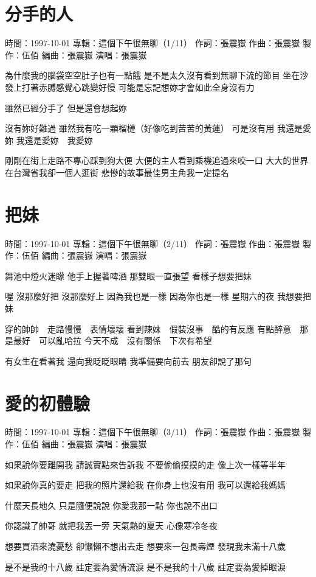 \documentclass[UTF8,a4paper,oneside,twocolumn,12pt]{ctexbook}
\newcommand{\infopair}[2]{\textbullet #1：#2}
\newcommand{\zc}[1][伍佰]{\infopair{作詞}{#1}}
\newcommand{\zq}[1][伍佰]{\infopair{作曲}{#1}}
\newcommand{\bq}[1][伍佰]{\infopair{編曲}{#1}}
\newcommand{\zj}[1]{\infopair{專輯}{#1}}
\newcommand{\zz}[1]{\infopair{製作}{#1}}
\newcommand{\sj}[1]{\infopair{時間}{#1}}
\newenvironment{info}{\begin{flushleft}\kaishu
	}
	{\end{flushleft}\normalsize\yahei\par}
\newenvironment{lyric}{
	}
{}
\begin{document}
\section{分手的人}
\begin{info}
	\sj{1997-10-01}
	\zj{這個下午很無聊（1/11）}
	\zc[張震嶽]
	\zq[張震嶽]
	\zz{伍佰}
	\bq[張震嶽]
	\infopair{演唱}{張震嶽}
\end{info}
\begin{lyric}
	為什麼我的腦袋空空肚子也有一點餓
	是不是太久沒有看到無聊下流的節目
	坐在沙發上打著赤膊感覺心跳變好慢
	可能是忘記想妳才會如此全身沒有力

	雖然已經分手了 但是還會想起妳

	沒有妳好難過
	雖然我有吃一顆榴槤（好像吃到苦苦的黃蓮）
	可是沒有用 我還是愛妳
	我還是愛妳　我愛妳

	剛剛在街上走路不專心踩到狗大便
	大便的主人看到乘機追過來咬一口
	大大的世界在台灣省我卻一個人逛街
	悲慘的故事最佳男主角我一定提名
\end{lyric}

\section{把妹}
\begin{info}
	\sj{1997-10-01}
	\zj{這個下午很無聊（2/11）}
	\zc[張震嶽]
	\zq[張震嶽]
	\zz{伍佰}
	\bq[張震嶽]
	\infopair{演唱}{張震嶽}
\end{info}
\begin{lyric}
	舞池中燈火迷矇 他手上握著啤酒
	那雙眼一直張望 看樣子想要把妹

	喔 沒那麼好把 沒那麼好上
	因為我也是一樣 因為你也是一樣
	星期六的夜 我想要把妹

	穿的帥帥　走路慢慢　表情壞壞
	看到辣妹　假裝沒事　酷的有反應
	有點醉意　那是最好　可以亂哈拉
	今天不成　沒有關係　下次有希望

	有女生在看著我 還向我眨眨眼睛
	我準備要向前去 朋友卻說了那句
\end{lyric}

\section{愛的初體驗}
\begin{info}
	\sj{1997-10-01}
	\zj{這個下午很無聊（3/11）}
	\zc[張震嶽]
	\zq[張震嶽]
	\zz{伍佰}
	\bq[張震嶽]
	\infopair{演唱}{張震嶽}
\end{info}
\begin{lyric}
	如果說你要離開我
	請誠實點來告訴我
	不要偷偷摸摸的走
	像上次一樣等半年

	如果說你真的要走
	把我的照片還給我
	在你身上也沒有用
	我可以還給我媽媽

	什麼天長地久
	只是隨便說說
	你愛我那一點
	你也說不出口

	你認識了帥哥
	就把我丟一旁
	天氣熱的夏天
	心像寒冷冬夜

	想要買酒來澆憂愁
	卻懶懶不想出去走
	想要來一包長壽煙
	發現我未滿十八歲

	是不是我的十八歲
	註定要為愛情流淚
	是不是我的十八歲
	註定要為愛掉眼淚
\end{lyric}
\end{document}
